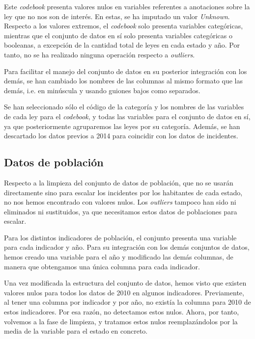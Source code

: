 \documentclass[11pt,a4paper]{article}
\begin{document}
Este \textit{codebook} presenta valores nulos en variables referentes a anotaciones sobre la ley que no nos son de interés. En estas, se ha imputado un valor \textit{Unknown}. Respecto a los valores extremos, el \textit{codebook} solo presenta variables categóricas, mientras que el conjunto de datos en sí solo presenta variables categóricas o booleanas, a excepción de la cantidad total de leyes en cada estado y año. Por tanto, no se ha realizado ninguna operación respecto a \textit{outliers}.

Para facilitar el manejo del conjunto de datos en su posterior integración con los demás, se han cambiado los nombres de las columnas al mismo formato que las demás, i.e. en minúscula y usando guiones bajos como separados.

Se han seleccionado sólo el código de la categoría y los nombres de las variables de cada ley para el \textit{codebook}, y todas las variables para el conjunto de datos en sí, ya que posteriormente agruparemos las leyes por su categoría. Además, se han descartado los datos previos a 2014 para coincidir con los datos de incidentes.

\subsection{Datos de población}

Respecto a la limpieza del conjunto de datos de población, que no se usarán directamente sino para escalar los incidentes por los habitantes de cada estado, no nos hemos encontrado con valores nulos. Los \textit{outliers} tampoco han sido ni eliminados ni sustituidos, ya que necesitamos estos datos de poblaciones para escalar.

Para los distintos indicadores de población, el conjunto presenta una variable para cada indicador y año. Para su integración con los demás conjuntos de datos, hemos creado una variable para el año y modificado las demás columnas, de manera que obtengamos una única columna para cada indicador.

Una vez modificada la estructura del conjunto de datos, hemos visto que existen valores nulos para todos los datos de 2010 en algunos indicadores. Previamente, al tener una columna por indicador y por año, no existía la columna para 2010 de estos indicadores. Por esa razón, no detectamos estos nulos. Ahora, por tanto, volvemos a la fase de limpieza, y tratamos estos nulos reemplazándolos por la media de la variable para el estado en concreto.
\end{document}
